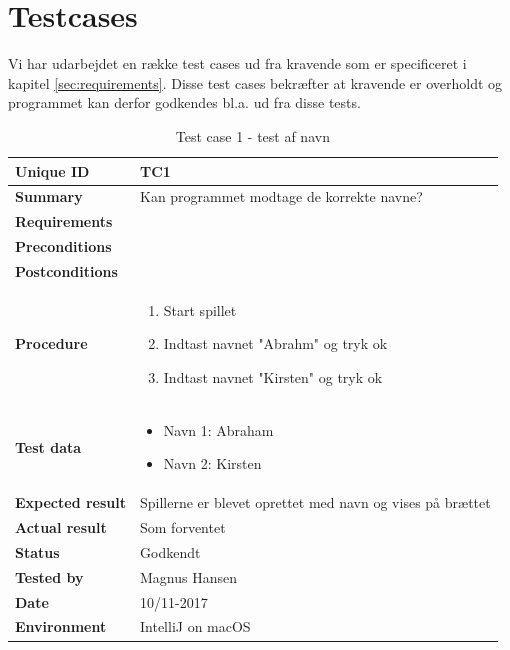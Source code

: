 \section{Testcases}

Vi har udarbejdet en række test cases ud fra kravende som er specificeret i kapitel \ref{sec:requirements}.
Disse test cases bekræfter at kravende er overholdt og programmet kan derfor godkendes bl.a. ud fra disse tests.

\begin{table}[H]
    \begin{center}
        \begin{tabular}{|l|p{8cm}|}
            \hline
            \textbf{Unique ID} & TC1 \\
            \hline
            \textbf{Summary} & Kan programmet modtage de korrekte navne? \\
            \hline
            \textbf{Requirements} & \\
            \hline
            \textbf{Preconditions} & \\
            \hline
            \textbf{Postconditions} & \\
            \hline
            \textbf{Procedure} & \begin{enumerate}
                \setlength\itemsep{0ex}
                \item Start spillet
                \item Indtast navnet "Abrahm" og tryk ok
                \item Indtast navnet "Kirsten" og tryk ok
            \end{enumerate} \\
            \hline
            \textbf{Test data} & \begin{itemize}
                \setlength\itemsep{0ex}
                \item Navn 1: Abraham
                \item Navn 2: Kirsten
            \end{itemize} \\
            \hline
            \textbf{Expected result} & Spillerne er blevet oprettet med navn og vises på brættet \\
            \hline
            \textbf{Actual result} & Som forventet \\
            \hline
            \textbf{Status} & Godkendt \\
            \hline
            \textbf{Tested by} & Magnus Hansen \\
            \hline
            \textbf{Date} & 10/11-2017 \\
            \hline
            \textbf{Environment} & IntelliJ on macOS \\
            \hline
        \end{tabular}
    \end{center}
    \caption{Test case 1 - test af navn}
    \label{tc:1}
\end{table}

